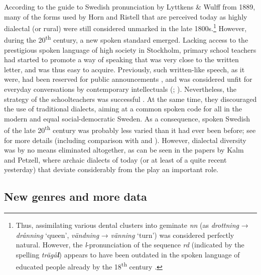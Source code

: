 \documentclass[output=paper]{langscibook}
\begin{document}
According to the guide to Swedish pronunciation by Lyttkens \& Wulff from 1889, many of the forms used by Horn and Ristell that are perceived today as highly dialectal (or rural) were still considered unmarked in the late 1800s.\footnote{Thus, assimilating various dental clusters into geminate \textit{nn} (as \textit{drottning} → \textit{drånning} ‘queen’, \textit{vändning} → \textit{vänning} ‘turn’) was considered perfectly natural. However, the \textit{l}{}-pronunciation of the sequence \textit{rd} (indicated by the spelling \textit{trägå}\textbf{\textit{l}}) appears to have been outdated in the spoken language of educated people already by the 18\textsuperscript{th} century \citep{Hof1753}.} However, during the 20\textsuperscript{th} century, a new spoken standard emerged. Lacking access to the prestigious spoken language of high society in Stockholm, primary school teachers had started to promote a way of speaking that was very close to the written letter, and was thus easy to acquire. Previously, such written-like speech, as it were, had been reserved for public announcements \citep{Widmark1970}, and was considered unfit for everyday conversations by contemporary intellectuals (\citealt{Cederschiold1897}; \citealt{Noreen1903}). Nevertheless, the strategy of the schoolteachers was successful \citep{Widmark2000}. At the same time, they discouraged the use of traditional dialects, aiming at a common spoken code for all in the modern and equal social-democratic Sweden. As a consequence, spoken Swedish of the late 20\textsuperscript{th} century was probably less varied than it had ever been before; see \citet{NilssonPetzell2015} for more details (including comparison with  and ). However, dialectal diversity was by no means eliminated altogether, as can be seen in the papers by Kalm and Petzell, where archaic dialects of today (or at least of a quite recent yesterday) that deviate considerably from the  play an important role.


\subsection{New genres and more data}\label{sec:intro:2.3}
\end{document}
